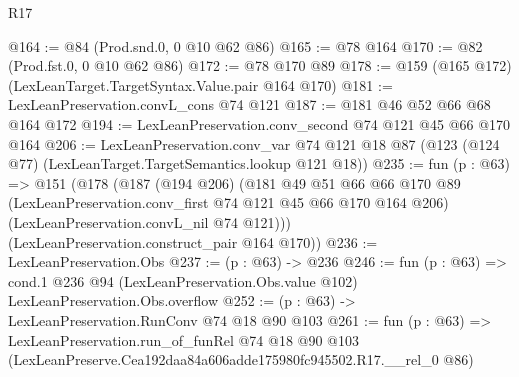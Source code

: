 \begin{lexlean}{R17}
\begin{coremodule}
@164 := @84 (Prod.snd.{0, 0} @10 @62 @86)
@165 := @78 @164
@170 := @82 (Prod.fst.{0, 0} @10 @62 @86)
@172 := @78 @170 @89
@178 := @159 (@165 @172) (LexLeanTarget.TargetSyntax.Value.pair @164 @170)
@181 := LexLeanPreservation.convL_cons @74 @121
@187 := @181 @46 @52 @66 @68 @164 @172
@194 := LexLeanPreservation.conv_second @74 @121 @45 @66 @170 @164
@206 := LexLeanPreservation.conv_var
    @74
    @121
    @18
    @87
    (@123 (@124 @77) (LexLeanTarget.TargetSemantics.lookup @121 @18))
@235 := fun (p : @63) =>
  @151
    (@178
      (@187
        (@194 @206)
        (@181
          @49
          @51
          @66
          @66
          @170
          @89
          (LexLeanPreservation.conv_first @74 @121 @45 @66 @170 @164 @206)
          (LexLeanPreservation.convL_nil @74 @121)))
      (LexLeanPreservation.construct_pair @164 @170))
@236 := LexLeanPreservation.Obs
@237 := (p : @63) -> @236
@246 := fun (p : @63) =>
  cond.{1} @236 @94 (LexLeanPreservation.Obs.value @102) LexLeanPreservation.Obs.overflow
@252 := (p : @63) -> LexLeanPreservation.RunConv @74 @18 @90 @103
@261 := fun (p : @63) =>
  LexLeanPreservation.run_of_funRel
    @74
    @18
    @90
    @103
    (LexLeanPreserve.Cea192daa84a606adde175980fc945502.R17.__rel_0 @86)
\end{coremodule}
\end{lexlean}
